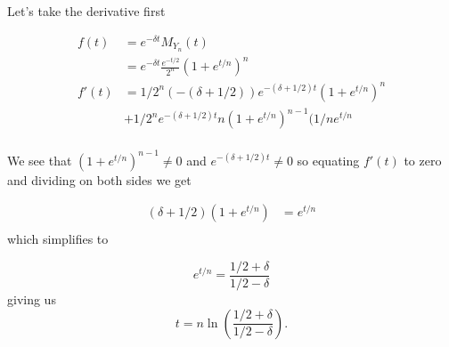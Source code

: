 
Let's take the derivative first

\begin{align*}
    f(t) &= e^{-\delta t} M_{Y_{n} } (t) \\
	 &=  e^{-\delta t} \frac{e^{-t/2} }{2^{n} } (1+ e^{t/n} )^{n} \\
    f'(t) &= 1/2^{n} (-(\delta + 1/2)) e^{-(\delta + 1/2)t} (1+ e^{t/n})^{n} \\
	  &+ 1/2^{n} e^{-(\delta + 1/2) t} n (1+ e^{t/n} )^{n-1} (1/n e^{t/n} \\
\end{align*}

We see that $ (1 + e^{t/n} )^{n-1} \neq 0$ and $ e^{-(\delta + 1/2)t} \neq 0$ so equating $ f'(t)$
to zero and dividing on both sides we get

\begin{align*}
    (\delta + 1/2)(1 + e^{t/n} ) &= e^{t/n}\\ 
\end{align*}
which simplifies to 

\[
    e^{t/n} = \frac{1/2 + \delta}{1/2- \delta} 
\] 
giving us 
\[
    t = n \ln \left( \frac{1/2 + \delta}{1/2 - \delta} \right)  
.\] 
